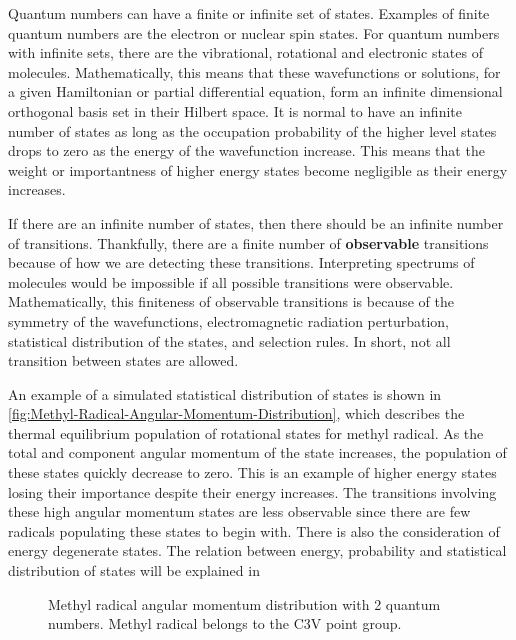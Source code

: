 \documentclass[11pt,a4paper]{book}
\newcommand{\imginput}[1]{} %
\begin{document}
	Quantum numbers can have a finite or infinite set of states. Examples of finite quantum numbers are the electron or nuclear spin states. For quantum numbers with infinite sets, there are the vibrational, rotational and electronic states of molecules. Mathematically, this means that these wavefunctions or solutions, for a given Hamiltonian or partial differential equation, form an infinite dimensional orthogonal basis set in their Hilbert space. It is normal to have an infinite number of states as long as the occupation probability of the higher level states drops to zero as the energy of the wavefunction increase. This means that the weight or importantness of higher energy states become negligible as their energy increases.
	
	If there are an infinite number of states, then there should be an infinite number of transitions. Thankfully, there are a finite number of \textbf{observable} transitions because of how we are detecting these transitions. Interpreting spectrums of molecules would be impossible if all possible transitions were observable. Mathematically, this finiteness of observable transitions is because of the symmetry of the wavefunctions, electromagnetic radiation perturbation, statistical distribution of the states, and selection rules. In short, not all transition between states are allowed.
	
	An example of a simulated statistical distribution of states is shown in \autoref{fig:Methyl-Radical-Angular-Momentum-Distribution}, which describes the thermal equilibrium population of rotational states for methyl radical. As the total and component angular momentum of the state increases, the population of these states quickly decrease to zero. This is an example of higher energy states losing their importance despite their energy increases. The transitions involving these high angular momentum states are less observable since there are few radicals populating these states to begin with. There is also the consideration of energy degenerate states. The relation between energy, probability and statistical distribution of states will be explained in %
	
	\begin{figure} [!ht]
		\centering
		\Large
		\def\svgwidth{\columnwidth}
		\resizebox{14cm}{!}{\imginput{images/Methyl-Radical-Angular-Momentum-Distribution.pdf_tex}}
		\caption{Methyl radical angular momentum distribution with 2 quantum numbers. Methyl radical belongs to the C3V point group.}
		\label{fig:Methyl-Radical-Angular-Momentum-Distribution}
	\end{figure}
	
\end{document}
